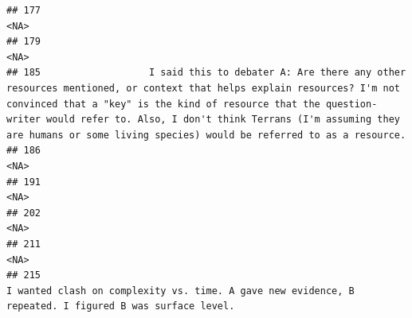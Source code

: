 \documentclass[
]{article}
\begin{document}
\begin{verbatim}
## 177                                                                                                                                                                                                                                                                                                                                                <NA>
## 179                                                                                                                                                                                                                                                                                                                                                <NA>
## 185                   I said this to debater A: Are there any other resources mentioned, or context that helps explain resources? I'm not convinced that a "key" is the kind of resource that the question-writer would refer to. Also, I don't think Terrans (I'm assuming they are humans or some living species) would be referred to as a resource.
## 186                                                                                                                                                                                                                                                                                                                                                <NA>
## 191                                                                                                                                                                                                                                                                                                                                                <NA>
## 202                                                                                                                                                                                                                                                                                                                                                <NA>
## 211                                                                                                                                                                                                                                                                                                                                                <NA>
## 215                                                                                                                                                                                                                                              I wanted clash on complexity vs. time. A gave new evidence, B repeated. I figured B was surface level.

\end{verbatim}
\end{document}
